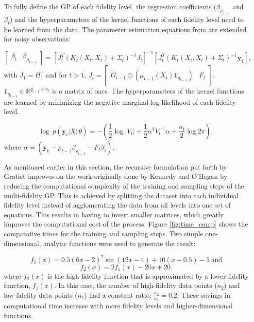 To fully define the GP of each fidelity level, the regression coefficients ($\beta_{\rho_{t-1}}$ and $\beta_t$) and the hyperparameters of the kernel functions of each fidelity level need to be learned from the data. The parameter estimation equations from  \cite{gratiet_multi-fidelity_nodate} are extended for noisy observations:

\begin{equation}
    \begin{bmatrix}
    \beta_t & \beta_{\rho_{t-1}}
    \end{bmatrix} = \left [ J_t^T \left ( K_t(X_t,X_t) + \Sigma_t \right )^{-1} J_t \right ]^{-1} \left [ J_t^T \left ( K_t(X_t,X_t) + \Sigma_t \right ) ^{-1} \mathbf{y_t} \right ], 
\end{equation}
with $J_1 = H_1$ and for $t > 1$, $J_t =  \begin{bmatrix} G_{t-1} \odot \left ( \mu_{t-1} \left ( X_t \right )  \mathbf{1}_{q_{t-1}} \right ) & F_t \end{bmatrix}$. $\mathbf{1}_{q_{t-1}} \in \mathbb{R} ^{q_{t-1} \times n_t} $ is a matrix of ones. The hyperparameters of the kernel functions are learned by minimizing the negative marginal log-likelihood of each fidelity level.

\begin{equation}
    \log~p(\mathbf{y}_t|X;\theta) = -\left (\frac{1}{2} \log|V_t| + \frac{1}{2} \alpha^T V_t^{-1} \alpha + \frac{n_t}{2}\log 2\pi \right),
\end{equation}
where $\alpha = \left (\mathbf{y_t} - \rho_{t-1} \beta_{\rho_{t-1}}-F_t\beta_t \right )$.

As mentioned earlier in this section, the recursive formulation put forth by Gratiet \cite{le_gratiet_recursive_2014} improves on the work originally done by Kennedy and O'Hagan \cite{kennedy_predicting_2000} by reducing the computational complexity of the training and sampling steps of the multi-fidelity GP. This is achieved by splitting the dataset into each individual fidelity level instead of agglomerating the data from all levels into one set of equations. This results in having to invert smaller matrices, which greatly improves the computational cost of the process. Figure \ref{fig:time_comp} shows the comparative times for the training and sampling steps. Two simple one-dimensional, analytic functions were used to generate the result: 

\begin{equation}
    f_1(x) = 0.5 \left ( 6x - 2\right )^2 \sin{ \left (12x -4 \right )} + 10 \left ( x - 0.5 \right ) -5 ~\text{and}
\end{equation}
\begin{equation}
        f_2(x) = 2f_1(x) - 20x + 20.
\end{equation}
where $f_2(x)$ is the high-fidelity function that is approximated by a lower fidelity function, $f_1(x)$.
In this case, the number of high-fidelity data points ($n_2$) and low-fidelity data points ($n_1$) had a constant ratio: $\frac{n_2}{n_1} = 0.2$. These savings in computational time increase with more fidelity levels and higher-dimensional functions. 

